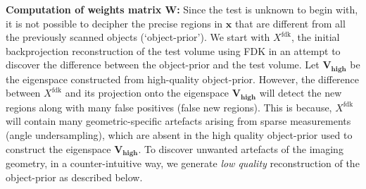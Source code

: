 \documentclass[journal]{IEEEtran}
\begin{document}
\textbf{Computation of weights matrix $\boldsymbol{W}$:}
Since the test is unknown to
begin with, it is not possible to decipher the precise regions in
$\boldsymbol{x}$ that are different from all the previously scanned
objects (`object-prior'). We start with $X^{\text{fdk}}$, the initial
backprojection reconstruction of the test volume using FDK in an attempt to
discover the difference between the object-prior and the test
volume. Let $\boldsymbol{V_{\text{high}}}$ be the eigenspace
constructed from high-quality object-prior. However, the difference
between $X^{\text{fdk}}$ and its projection onto the eigenspace
$\boldsymbol{V_{\text{high}}}$ will detect the new regions along with
many false positives (false new regions). This is because,
$X^{\text{fdk}}$ will contain many geometric-specific artefacts
arising from sparse measurements (angle undersampling), which are
absent in the high quality object-prior used to construct the
eigenspace $\boldsymbol{V_{\text{high}}}$. To discover unwanted
artefacts of the imaging geometry, in a counter-intuitive way, we
generate \emph{low quality} reconstruction of the object-prior as
described below.
\end{document}
